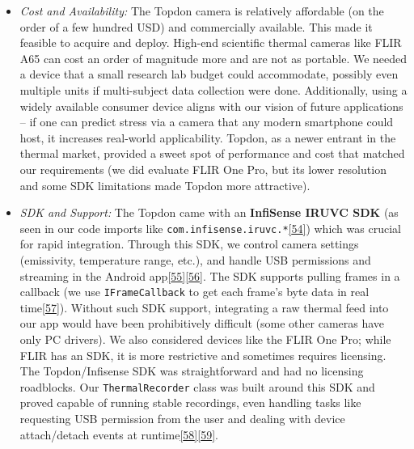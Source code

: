 \documentclass[12pt,a4paper]{article}
\begin{document}
\begin{itemize}
\item
  \emph{Cost and Availability:} The Topdon camera is relatively affordable (on the order of a few hundred USD) and commercially available. This made it feasible to acquire and deploy. High-end scientific thermal cameras like FLIR A65 can cost an order of magnitude more and are not as portable. We needed a device that a small research lab budget could accommodate, possibly even multiple units if multi-subject data collection were done. Additionally, using a widely available consumer device aligns with our vision of future applications -- if one can predict stress via a camera that any modern smartphone could host, it increases real-world applicability. Topdon, as a newer entrant in the thermal market, provided a sweet spot of performance and cost that matched our requirements (we did evaluate FLIR One Pro, but its lower resolution and some SDK limitations made Topdon more attractive).
\item
  \emph{SDK and Support:} The Topdon came with an \textbf{InfiSense IRUVC SDK} (as seen in our code imports like \passthrough{\lstinline!com.infisense.iruvc.*!}\href{https://github.com/buccancs/bucika_gsr/blob/7048f7f6a7536f5cd577ed2184800d3dad97fd08/AndroidApp/src/main/java/com/multisensor/recording/recording/ThermalRecorder.kt\#L14-L22}{{[}54{]}}) which was crucial for rapid integration. Through this SDK, we control camera settings (emissivity, temperature range, etc.), and handle USB permissions and streaming in the Android app\href{https://github.com/buccancs/bucika_gsr/blob/7048f7f6a7536f5cd577ed2184800d3dad97fd08/AndroidApp/src/main/java/com/multisensor/recording/recording/ThermalRecorder.kt\#L169-L177}{{[}55{]}}\href{https://github.com/buccancs/bucika_gsr/blob/7048f7f6a7536f5cd577ed2184800d3dad97fd08/AndroidApp/src/main/java/com/multisensor/recording/recording/ThermalRecorder.kt\#L174-L182}{{[}56{]}}. The SDK supports pulling frames in a callback (we use \passthrough{\lstinline!IFrameCallback!} to get each frame's byte data in real time\href{https://github.com/buccancs/bucika_gsr/blob/7048f7f6a7536f5cd577ed2184800d3dad97fd08/AndroidApp/src/main/java/com/multisensor/recording/recording/ThermalRecorder.kt\#L38-L46}{{[}57{]}}). Without such SDK support, integrating a raw thermal feed into our app would have been prohibitively difficult (some other cameras have only PC drivers). We also considered devices like the FLIR One Pro; while FLIR has an SDK, it is more restrictive and sometimes requires licensing. The Topdon/Infisense SDK was straightforward and had no licensing roadblocks. Our \passthrough{\lstinline!ThermalRecorder!} class was built around this SDK and proved capable of running stable recordings, even handling tasks like requesting USB permission from the user and dealing with device attach/detach events at runtime\href{https://github.com/buccancs/bucika_gsr/blob/7048f7f6a7536f5cd577ed2184800d3dad97fd08/AndroidApp/src/main/java/com/multisensor/recording/recording/ThermalRecorder.kt\#L104-L113}{{[}58{]}}\href{https://github.com/buccancs/bucika_gsr/blob/7048f7f6a7536f5cd577ed2184800d3dad97fd08/AndroidApp/src/main/java/com/multisensor/recording/recording/ThermalRecorder.kt\#L130-L138}{{[}59{]}}.

\end{itemize}
\end{document}
